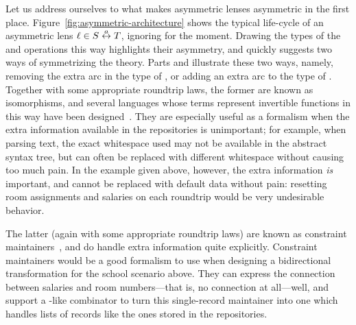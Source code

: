 Let us address ourselves to what makes asymmetric lenses asymmetric in the
first place. Figure~\ref{fig:asymmetric-architecture} shows the typical
life-cycle of an asymmetric lens $\ell \in S \overset{a}{\leftrightarrow} T$, ignoring \CREATE for
the moment. Drawing the types of the \GET and \PUT operations this way
highlights their asymmetry, and quickly suggests two ways of symmetrizing
the theory. Parts  and
 illustrate these two ways,
namely, removing the extra arc in the type of \PUT, or adding an extra arc
to the type of \GET. Together with some appropriate roundtrip laws, the
former are known as isomorphisms, and several languages whose terms
represent invertible functions in this way have been
designed~\cite{xsugar,rendel2010invertible}. They are especially useful as a
formalism when the extra information available in the repositories is
unimportant; for example, when parsing text, the exact whitespace used may
not be available in the abstract syntax tree, but can often be replaced with
different whitespace without causing too much pain. In the example given
above, however, the extra information \emph{is} important, and cannot be
replaced with default data without pain: resetting room assignments and
salaries on each roundtrip would be very undesirable behavior.

The latter (again with some appropriate roundtrip laws) are known as
constraint maintainers~\cite{Meertens98}, and do handle extra information
quite explicitly. Constraint maintainers would be a good formalism to use
when designing a bidirectional transformation for the school scenario above.
They can express the connection between salaries and room numbers---that is,
no connection at all---well, and support a \map-like combinator to turn this
single-record maintainer into one which handles lists of records like the
ones stored in the repositories.

